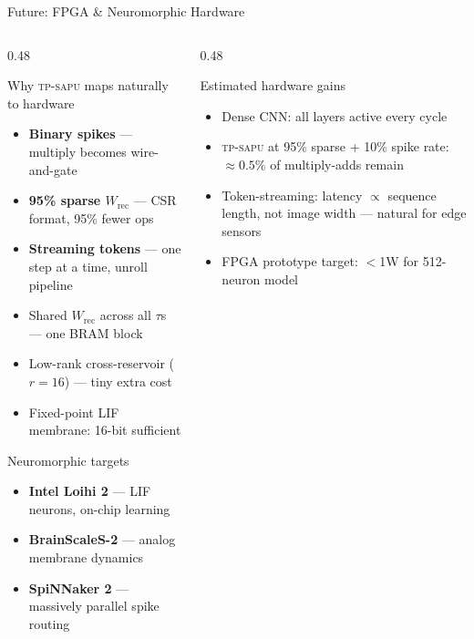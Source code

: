 \documentclass[aspectratio=169,11pt]{beamer}
\newcommand{\hl}[1]{{\color{highlight}\textbf{#1}}}
\newcommand{\tpsapu}{\textsc{tp-sapu}}
\begin{document}
\begin{frame}[shrink=12]{Future: FPGA \& Neuromorphic Hardware}
\begin{columns}[T]
\begin{column}{0.48\textwidth}
  \begin{block}{Why \tpsapu{} maps naturally to hardware}
    \begin{itemize}\small
      \item \hl{Binary spikes} — multiply becomes wire-and-gate
      \item \hl{95\% sparse $W_\text{rec}$} — CSR format, 95\% fewer ops
      \item \hl{Streaming tokens} — one step at a time, unroll pipeline
      \item Shared $W_\text{rec}$ across all $\tau$s — one BRAM block
      \item Low-rank cross-reservoir ($r{=}16$) — tiny extra cost
      \item Fixed-point LIF membrane: 16-bit sufficient
    \end{itemize}
  \end{block}
  \vspace{0.3em}
  \begin{alertblock}{Neuromorphic targets}
    \begin{itemize}\scriptsize
      \item \textbf{Intel Loihi 2} — LIF neurons, on-chip learning
      \item \textbf{BrainScaleS-2} — analog membrane dynamics
      \item \textbf{SpiNNaker 2} — massively parallel spike routing
    \end{itemize}
  \end{alertblock}
\end{column}
\begin{column}{0.48\textwidth}
  \begin{exampleblock}{Estimated hardware gains}
    \begin{itemize}\scriptsize
      \item Dense CNN: all layers active every cycle
      \item \tpsapu{} at 95\% sparse + 10\% spike rate:
            $\approx\mathbf{0.5\%}$ of multiply-adds remain
      \item Token-streaming: latency $\propto$ sequence length,
            not image width — natural for edge sensors
      \item FPGA prototype target: $<$1W for 512-neuron model
    \end{itemize}
  \end{exampleblock}
  \vspace{0.2em}
\end{column}
\end{columns}
\end{frame}
\end{document}
